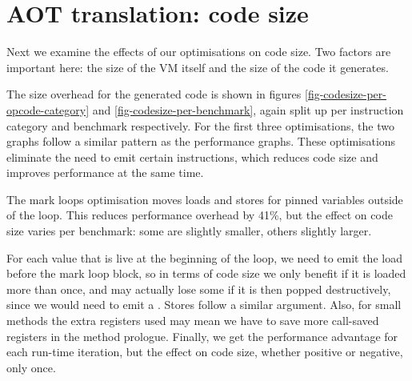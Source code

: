 

\section{AOT translation: code size}
\label{sec-evaluation-aot-translation-code-size}
Next we examine the effects of our optimisations on code size. Two factors are important here: the size of the VM itself and the size of the code it generates.

The size overhead for the generated code is shown in figures \ref{fig-codesize-per-opcode-category} and \ref{fig-codesize-per-benchmark}, again split up per instruction category and benchmark respectively. For the first three optimisations, the two graphs follow a similar pattern as the performance graphs. These optimisations eliminate the need to emit certain instructions, which reduces code size and improves performance at the same time.

The mark loops optimisation moves loads and stores for pinned variables outside of the loop. This reduces performance overhead by 41\%, but the effect on code size varies per benchmark: some are slightly smaller, others slightly larger.

For each value that is live at the beginning of the loop, we need to emit the load before the mark loop block, so in terms of code size we only benefit if it is loaded more than once, and may actually lose some if it is then popped destructively, since we would need to emit a . Stores follow a similar argument. Also, for small methods the extra registers used may mean we have to save more call-saved registers in the method prologue. Finally, we get the performance advantage for each run-time iteration, but the effect on code size, whether positive or negative, only once.


